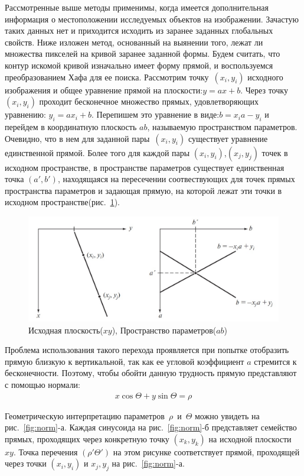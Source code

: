 \documentclass[12pt]{article} %
\begin{document}
Рассмотренные выше методы применимы, когда имеется дополнительная информация о местоположении исследуемых объектов на изображении. Зачастую таких данных нет и приходится исходить из заранее заданных глобальных свойств. Ниже изложен метод, основанный на выянении того, лежат ли множества пикселей на кривой заранее заданной формы.
Будем считать, что контур искомой кривой изначально имеет форму прямой, и воспользуемся преобразованием Хафа для ее поиска.
Рассмотрим точку~$(x_i, y_i)$ исходного изображения и общее уравнение прямой на плоскости:$y = ax+b$. Через точку~$(x_i, y_i)$ проходит бесконечное множество прямых, удовлетворяющих уравнению: $y_i = ax_i+b$. Перепишем это уравнение в виде:$b = x_i a - y_i$ и перейдем в координатную плоскость $ab$, называемую пространством параметров. Очевидно, что в нем для заданной пары~$(x_i, y_i)$ существует уравнение единственной прямой. Более того для каждой пары $(x_i, y_i)$,$(x_j, y_j)$ точек в исходном пространстве, в пространстве параметров существует единственная точка $(a', b')$, находящаяся на пересечении соотвествующих для точек прямых пространства параметров и задающая прямую, на которой лежат эти точки в исходном пространстве(рис.~\ref{fig:param_haf}).

\begin{figure}[h]
	
	\centering
	
	\includegraphics[width=0.6\linewidth]{param_haf.jpg}
	
	\caption{Исходная плоскость($xy$), Пространство параметров($ab$)}
	
	\label{fig:param_haf}
	
\end{figure}

Проблема использования такого перехода проявляется при попытке отобразить прямую близкую к вертикальной, так как ее угловой коэффициент $a$ стремится к бесконечности. Поэтому, чтобы обойти данную трудность прямую представляют с помощью нормали:
\begin{gather}\label{norm}
	x\cos{\Theta} + y\sin{\Theta} = \rho
\end{gather}

Геометрическую интерпретацию параметров~$\rho$~и~$\Theta$ можно увидеть на рис.~\ref{fig:norm}-а. Каждая синусоида на рис.~\ref{fig:norm}-б представляет семейство прямых, проходящих через конкретную точку $(x_k, y_k)$ на исходной плоскости $xy$. Точка перечения $(\rho'\Theta')$ на этом рисунке соответствует прямой, проходящей через точки $(x_i, y_i)$ и $x_j, y_j$ на рис.~\ref{fig:norm}-а.
\end{document}
